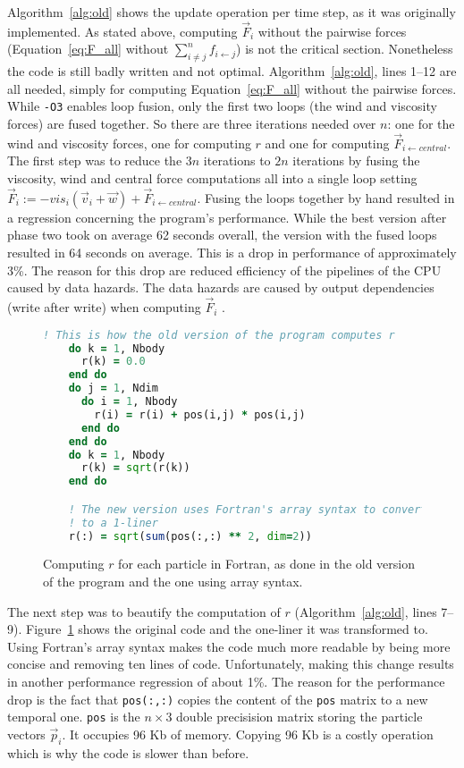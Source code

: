 \documentclass[twoside,11pt]{article}
\begin{document}
Algorithm~\ref{alg:old} shows the update operation per time step,
as it was originally implemented.
As stated above, computing $\vec{F}_i$ without the pairwise
forces (Equation~\ref{eq:F_all} without
$\sum_{i \neq j}^n f_{i \leftarrow j}$) is not the critical section.
Nonetheless the code is still badly written and not optimal.
Algorithm~\ref{alg:old}, lines 1--12 are all needed, simply for
computing Equation~\ref{eq:F_all} without the pairwise forces.
While \texttt{-O3} enables loop fusion, only the first two loops
(the wind and viscosity forces) are fused together.
So there are three iterations needed over $n$: one for the wind and
viscosity forces, one for computing $r$ and one for computing
$\vec{F}_{i \leftarrow central}$.
The first step was to reduce the $3n$ iterations to $2n$ iterations by
fusing the viscosity, wind and central force computations all into
a single loop setting $\vec{F}_i := -vis_i(\vec{v}_i + \vec{w}) +
  \vec{F}_{i \leftarrow central}$.
Fusing the loops together by hand resulted in a regression concerning
the program's performance.
While the best version after phase two took on average 62 seconds
overall, the version with the fused loops resulted in 64 seconds
on average.
This is a drop in performance of approximately 3\%.
The reason for this drop are reduced efficiency of the pipelines of
the CPU caused by data hazards.
The data hazards are caused by output dependencies (write after write)
when computing $\vec{F}_i$ \citep[see e.g.][]{patterson_2014}.

\begin{figure} %
  \begin{lstlisting}[language=Fortran]
    ! This is how the old version of the program computes r
    do k = 1, Nbody
      r(k) = 0.0
    end do
    do j = 1, Ndim
      do i = 1, Nbody
        r(i) = r(i) + pos(i,j) * pos(i,j)
      end do
    end do
    do k = 1, Nbody
      r(k) = sqrt(r(k))
    end do

    ! The new version uses Fortran's array syntax to convert this
    ! to a 1-liner
    r(:) = sqrt(sum(pos(:,:) ** 2, dim=2))

  \end{lstlisting}
  \caption{Computing $r$ for each particle in Fortran, as done in the
    old version of the program and the one using array syntax.}
  \label{fig:r}
\end{figure} %

The next step was to beautify the computation of $r$
(Algorithm~\ref{alg:old}, lines 7--9).
Figure~\ref{fig:r} shows the original code and the one-liner it
was transformed to.
Using Fortran's array syntax makes the code much more readable by
being more concise and removing ten lines of code.
Unfortunately, making this change results in another performance
regression of about 1\%.
The reason for the performance drop is the fact that \texttt{pos(:,:)}
copies the content of the \texttt{pos} matrix to a new temporal one.
\texttt{pos} is the $n \times 3$ double precisision matrix storing the
particle vectors $\vec{p}_i$.
It occupies 96 Kb of memory.
Copying 96 Kb is a costly operation which is why the code is slower
than before.
\end{document}
